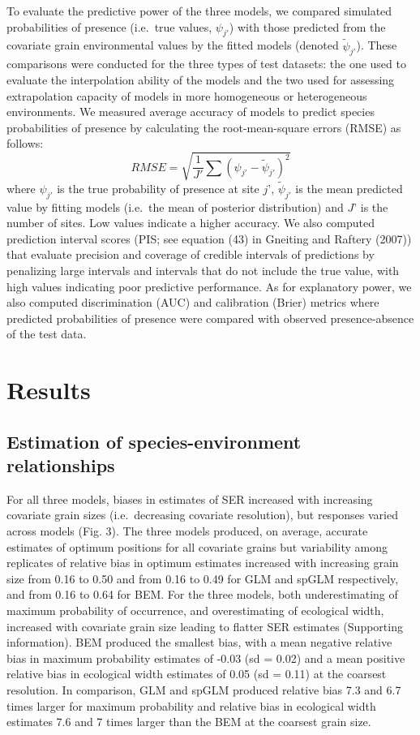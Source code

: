 \documentclass[
  12pt,
  a4paper]{article}
\begin{document}
To evaluate the predictive power of the three models, we compared simulated probabilities of presence (i.e.~true values, \(\psi_{j'}\)) with those predicted from the covariate grain environmental values by the fitted models (denoted \(\tilde\psi_{j'}\)). These comparisons were conducted for the three types of test datasets: the one used to evaluate the interpolation ability of the models and the two used for assessing extrapolation capacity of models in more homogeneous or heterogeneous environments. We measured average accuracy of models to predict species probabilities of presence by calculating the root-mean-square errors (RMSE) as follows:
\[RMSE = \sqrt{\frac{1}{J'}\sum(\psi_{j'} - \tilde\psi_{j'})^2}\]
where \(\psi_{j'}\) is the true probability of presence at site \(j’\), \(\tilde\psi_{j'}\) is the mean predicted value by fitting models (i.e.~the mean of posterior distribution) and \(J’\) is the number of sites. Low values indicate a higher accuracy. We also computed prediction interval scores (PIS; see equation (43) in Gneiting and Raftery (2007)) that evaluate precision and coverage of credible intervals of predictions by penalizing large intervals and intervals that do not include the true value, with high values indicating poor predictive performance. As for explanatory power, we also computed discrimination (AUC) and calibration (Brier) metrics where predicted probabilities of presence were compared with observed presence-absence of the test data.

\hypertarget{results}{%
\section{Results}\label{results}}

\hypertarget{estimation-of-species-environment-relationships}{%
\subsection{Estimation of species-environment relationships}\label{estimation-of-species-environment-relationships}}

For all three models, biases in estimates of SER increased with increasing covariate grain sizes (i.e.~decreasing covariate resolution), but responses varied across models (Fig. 3). The three models produced, on average, accurate estimates of optimum positions for all covariate grains but variability among replicates of relative bias in optimum estimates increased with increasing grain size from 0.16 to 0.50 and from 0.16 to 0.49 for GLM and spGLM respectively, and from 0.16 to 0.64 for BEM. For the three models, both underestimating of maximum probability of occurrence, and overestimating of ecological width, increased with covariate grain size leading to flatter SER estimates (Supporting information). BEM produced the smallest bias, with a mean negative relative bias in maximum probability estimates of -0.03 (sd = 0.02) and a mean positive relative bias in ecological width estimates of 0.05 (sd = 0.11) at the coarsest resolution. In comparison, GLM and spGLM produced relative bias 7.3 and 6.7 times larger for maximum probability and relative bias in ecological width estimates 7.6 and 7 times larger than the BEM at the coarsest grain size.
\end{document}
